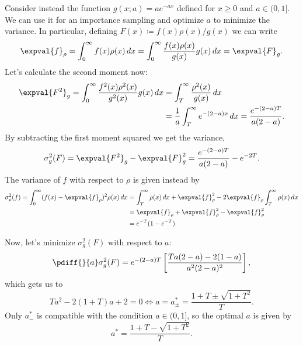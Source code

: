 Consider instead the function $g(x; a) = ae^{-ax}$ defined for $x \geq 0$ and $a
\in (0, 1]$. We can use it for an importance sampling and optimize $a$ to
minimize the variance. In particular, defining $F(x) \coloneq f(x) \rho(x) /
g(x)$ we can write
\begin{equation}
  \expval{f}_{\rho} = \int_{0}^{\infty} f(x) \rho(x) \, dx = 
  \int_{0}^{\infty} \frac{f(x)\rho(x)}{g(x)} g(x) \, dx = 
  \expval{F}_{g}.
\end{equation}
Let’s calculate the second moment now:
\begin{equation}
  \begin{split}
    \expval{F^{2}}_{g} = \int_{0}^{\infty} \frac{f^{2}(x) \rho^2(x)}{g^{2}(x)}
    g(x) \, dx &= \int_{T}^{\infty} \frac{\rho^{2}(x)}{g(x)}\, dx \\
               &= \frac{1}{a} \int_{T}^{\infty} e^{-(2-a) x} \, dx =
               \frac{e^{-(2-a)T}}{a(2-a)}.
  \end{split}
\end{equation}
By subtracting the first moment squared we get the variance,
\begin{equation}
  \sigma^{2}_g(F) = \expval{F^{2}}_g - \expval{F}_{g}^{2}
  = \frac{e^{-(2-a)T}}{a(2-a)} - e^{-2T}.
\end{equation}
The variance of $f$ with respect to $\rho$ is given instead by
\begin{equation}
  \begin{split}
    \sigma^{2}_{\rho}(f)
    = \int_{0}^{\infty} (f(x) - \expval{f}_{\rho})^{2} \rho(x) \, dx
    &= \int_{T}^{\infty} \rho(x) \, dx + \expval{f}_{\rho}^{2}
    - 2 \expval{f}_{\rho} \int_{T}^{\infty} \rho(x) \, dx \\
    &= \expval{f}_{\rho} + \expval{f}^{2}_{\rho} - \expval{f}^{2}_{\rho} \\
    &= e^{-T}(1 - e^{-T}).
  \end{split}
\end{equation}

Now, let’s minimize $\sigma^{2}_g(F)$ with respect to $a$:
\begin{equation}
  \pdiff{}{a} \sigma^{2}_{g}(F) = e^{-(2-a)T} \left[\frac{Ta(2-a) -
  2(1-a)}{a^{2}(2-a)^{2}}\right],
\end{equation}
which gets us to
\begin{equation}
  Ta^{2} - 2(1 + T) a + 2 = 0 \iff a = a^*_{\pm}
  = \frac{1 + T \pm \sqrt{1 + T^{2}}}{T}.
\end{equation}
Only $a^*_{-}$ is compatible with the condition $a \in (0, 1]$, so the optimal
$a$ is given by
\begin{equation}
  a^* = \frac{1 + T - \sqrt{1 + T^{2}}}{T}.
\end{equation}

